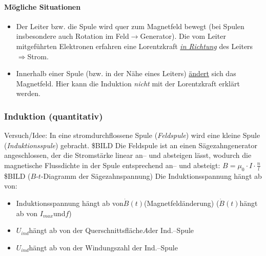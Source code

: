 \documentclass[a4paper]{scrartcl}
\begin{document}
\paragraph{Mögliche Situationen}
\begin{itemize}
	\item Der Leiter bzw. die Spule wird quer zum Magnetfeld bewegt (bei Spulen
	insbesondere auch Rotation im Feld\(\rightarrow\)Generator). Die vom Leiter
	mitgeführten  Elektronen erfahren eine Lorentzkraft \emph{\underline{in
	Richtung}} des Leiters\(\Rightarrow\)Strom.
	\item Innerhalb einer Spule (bzw. in der Nähe eines Leiters)
	\underline{ändert}
sich das Magnetfeld. Hier kann die Induktion \emph{nicht} mit der Lorentzkraft
erklärt werden.
\end{itemize}

\subsubsection{Induktion (quantitativ)}
Versuch/Idee: In eine stromdurchflossene Spule (\emph{Feldspule}) wird eine
kleine Spule (\emph{Induktionsspule}) gebracht.
\$BILD
Die Feldspule ist an einen Sägezahngenerator angeschlossen, der die Stromstärke
linear an-- und absteigen lässt, wodurch die magnetische Flussdichte in der
Spule entsprechend an-- und absteigt: \(B = \mu_0 \cdot I \cdot \frac{n}{l}\)
\$BILD (\(B\)-\(t\)-Diagramm der Sägezahnspannung)
Die Induktionsspannung hängt ab von:
\begin{itemize}
	\item Induktionsspannung hängt ab von\(\dot{B}(t)\)(Magnetfeldänderung)
		(\(\dot{B}(t)\)hängt ab von \(I_{max}\)und\(f\))
	\item\(U_{ind}\)hängt ab von der Querschnittsfläche\(A\)der Ind.--Spule
	\item\(U_{ind}\)hängt ab von der Windungszahl der Ind.--Spule
\end{itemize}
\end{document}
